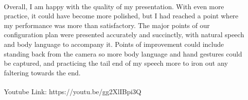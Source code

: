 \documentclass[11pt, a4paper]{article}
\begin{document}
	\paragraph{} {Overall, I am happy with the quality of my presentation. With even more practice, it could have become more polished, but I had reached a point where my performance was more than satisfactory. The major points of our configuration plan were presented accurately and succinctly, with natural speech and body language to accompany it. Points of improvement could include standing back from the camera so more body language and hand gestures could be captured, and practicing the tail end of my speech more to iron out any faltering towards the end.}
	\\
	\\
	Youtube Link: https://youtu.be/gg2XlIBpi3Q
	
	
	
	
\end{document}
